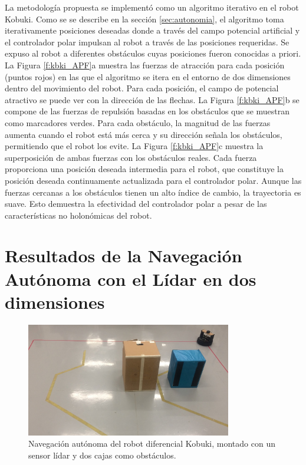 La metodología propuesta se implementó como un algoritmo iterativo en el robot Kobuki. 
Como se se describe en la sección \ref{sec:autonomia}, el algoritmo toma iterativamente 
posiciones deseadas  donde a través del campo potencial artificial y el controlador 
polar impulsan al robot a través de las posiciones requeridas. Se expuso al robot 
a diferentes obstáculos cuyas posiciones fueron conocidas a priori. La Figura 
\ref{f:kbki_APF}a muestra las fuerzas de atracción para cada posición (puntos rojos) en 
las que el algoritmo se itera en el entorno de dos dimensiones dentro del movimiento del 
robot. Para cada posición, el campo de potencial atractivo se puede ver con la dirección 
de las flechas. La Figura \ref{f:kbki_APF}b se compone de las fuerzas de repulsión basadas en 
los obstáculos que se muestran como marcadores verdes. Para cada obstáculo, la magnitud de 
las fuerzas aumenta cuando el robot está más cerca y su dirección señala los obstáculos, permitiendo 
que el robot los evite. La Figura \ref{f:kbki_APF}c muestra la superposición de ambas fuerzas 
con los obstáculos reales. Cada fuerza proporciona una posición deseada intermedia para el 
robot, que constituye la posición deseada continuamente actualizada para el controlador 
polar. Aunque las fuerzas cercanas a los obstáculos tienen un alto índice de cambio, la 
trayectoria es suave. Esto demuestra la efectividad del controlador polar a pesar de las 
características no holonómicas del robot.

\section{Resultados de la Navegación Autónoma con el Lídar en dos dimensiones}
\begin{figure}%
  \centering \footnotesize
  \includegraphics[width=0.80\textwidth]{images/kobuki_201.jpg}
  \captionsetup{font=footnotesize}
  \caption{Navegación autónoma del robot diferencial Kobuki, montado con un sensor lídar y dos cajas
  como obstáculos.}
  \label{fig:Kobuki201}
\end{figure}

